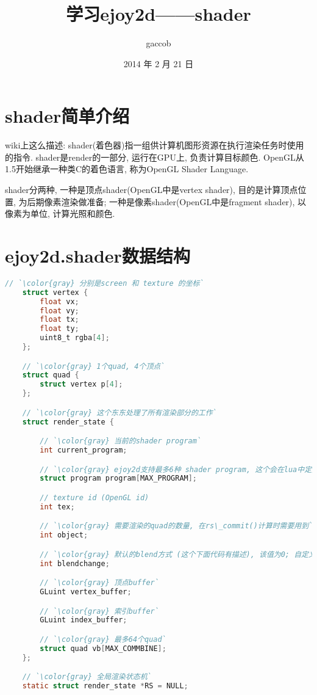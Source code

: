 

\title {\ZHH \huge 学习ejoy2d——shader}
\author {\small gaccob}
\date {\small 2014 年 2 月 21 日}
\maketitle


\section {\ZHH shader简单介绍} {
    {wiki上这么描述: shader(着色器)指一组供计算机图形资源在执行渲染任务时使用的指令. shader是render的一部分, 运行在GPU上, 负责计算目标颜色. OpenGL从1.5开始继承一种类C的着色语言, 称为OpenGL Shader Language.}\par
    {shader分两种, 一种是顶点shader(OpenGL中是vertex shader), 目的是计算顶点位置, 为后期像素渲染做准备; 一种是像素shader(OpenGL中是fragment shader), 以像素为单位, 计算光照和颜色. }\par
}


\section {\ZHH ejoy2d.shader数据结构} {
    \begin{lstlisting}[language=C]
    // `\color{gray} 分别是screen 和 texture 的坐标`
    struct vertex {
        float vx;
        float vy;
        float tx;
        float ty;
        uint8_t rgba[4];
    };

    // `\color{gray} 1个quad, 4个顶点`
    struct quad {
        struct vertex p[4];
    };

    // `\color{gray} 这个东东处理了所有渲染部分的工作`
    struct render_state {

        // `\color{gray} 当前的shader program`
        int current_program;

        // `\color{gray} ejoy2d支持最多6种 shader program, 这个会在lua中定义`
        struct program program[MAX_PROGRAM];

        // texture id (OpenGL id)
        int tex;

        // `\color{gray} 需要渲染的quad的数量, 在rs\_commit()计算时需要用到`
        int object;

        // `\color{gray} 默认的blend方式 (这个下面代码有描述), 该值为0; 自定义blend方式时, 这个值=1`
        int blendchange;

        // `\color{gray} 顶点buffer`
        GLuint vertex_buffer;

        // `\color{gray} 索引buffer`
        GLuint index_buffer;

        // `\color{gray} 最多64个quad`
        struct quad vb[MAX_COMMBINE];
    };

    // `\color{gray} 全局渲染状态机`
    static struct render_state *RS = NULL;
    \end{lstlisting}
}


